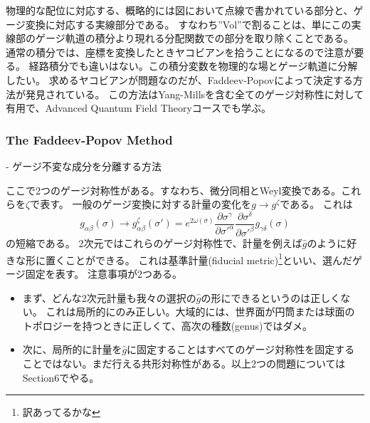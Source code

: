 \documentclass[10pt]{jsarticle}
\newcommand{\henbi}[2]{{\frac{\partial#1}{\partial#2}}} %
\begin{document}
物理的な配位に対応する、概略的には図において点線で書かれている部分と、ゲージ変換に対応する実線部分である。
すなわち''Vol''で割ることは、単にこの実線部のゲージ軌道の積分より現れる分配関数での部分を取り除くことである。
通常の積分では、座標を変換したときヤコビアンを拾うことになるので注意が要る。
経路積分でも違いはない。この積分変数を物理的な場とゲージ軌道に分解したい。
求めるヤコビアンが問題なのだが、Faddeev-Popovによって決定する方法が発見されている。
この方法はYang-Millsを含む全てのゲージ対称性に対して有用で、Advanced Quantum Field Theoryコースでも学ぶ。
\subsubsection{The Faddeev-Popov Method}
- ゲージ不変な成分を分離する方法


ここで2つのゲージ対称性がある。すなわち、微分同相とWeyl変換である。これらを$\zeta$で表す。
一般のゲージ変換に対する計量の変化を$g\to g^{\zeta}$である。
これは
\begin{equation}
  g_{\alpha\beta}(\sigma)\to g^{\zeta}_{\alpha\beta}(\sigma')=e^{2\omega(\sigma)}\henbi{\sigma^{\gamma}}{\sigma'^{\alpha}}\henbi{\sigma^{\delta}}{\sigma'^{\beta}}g_{\gamma\delta }(\sigma)
\end{equation}
の短縮である。
2次元ではこれらのゲージ対称性で、計量を例えば$\hat{g}$のように好きな形に置くことができる。
これは基準計量(fiducial metric)\footnote{訳あってるかな}といい、選んだゲージ固定を表す。
注意事項が2つある。
\begin{itemize}
  \item まず、どんな2次元計量も我々の選択の$\hat{g}$の形にできるというのは正しくない。
  これは局所的にのみ正しい。大域的には、世界面が円筒または球面のトポロジーを持つときに正しくて、高次の種数(genus)ではダメ。
  \item 次に、局所的に計量を$\hat{g}$に固定することはすべてのゲージ対称性を固定することではない。まだ行える共形対称性がある。以上2つの問題についてはSection6でやる。
\end{itemize}
\end{document}
